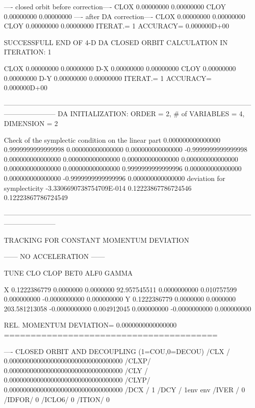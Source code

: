 \begin{ctverbatim}
---- closed orbit before correction----
 CLOX    0.00000000       0.00000000    
 CLOY    0.00000000       0.00000000    
---- after DA correction----
 CLOX    0.00000000       0.00000000    
 CLOY    0.00000000       0.00000000    
 ITERAT.=  1 ACCURACY= 0.000000D+00

SUCCESSFULL END OF 4-D DA CLOSED ORBIT CALCULATION IN ITERATION:    1

 CLOX    0.00000000       0.00000000    
  D-X    0.00000000       0.00000000    
 CLOY    0.00000000       0.00000000    
  D-Y    0.00000000       0.00000000    
 ITERAT.=  1 ACCURACY= 0.000000D+00


-----------------------------------------------------------------------------------------------------------------------------------
     DA INITIALIZATION: ORDER =  2, # of VARIABLES =  4, DIMENSION =  2

Check of the symplectic condition on the linear part
0.000000000000000       0.9999999999999998        0.000000000000000        0.000000000000000    
-0.9999999999999998        0.000000000000000        0.000000000000000        0.000000000000000    
0.000000000000000        0.000000000000000        0.000000000000000       0.9999999999999996    
0.000000000000000        0.000000000000000      -0.9999999999999996        0.000000000000000    
deviation for symplecticity   -3.3306690738754709E-014  %
0.12223867786724546       0.12223867786724549     

-----------------------------------------------------------------------------------------------------------------------------------

    TRACKING FOR CONSTANT MOMENTUM DEVIATION

          ------ NO ACCELERATION ------

                TUNE         CLO            CLOP              BET0           ALF0           GAMMA      

      X    0.1222386779   0.0000000       0.0000000        92.957545511    0.0000000000    0.010757599
                                                            0.000000000   -0.0000000000    0.000000000
      Y    0.1222386779   0.0000000       0.0000000       203.581213058   -0.0000000000    0.004912045
                                                            0.000000000   -0.0000000000    0.000000000


    REL. MOMENTUM DEVIATION= 0.0000000000000000
  ========================================

---- CLOSED ORBIT AND DECOUPLING (1=COU,0=DECOU)
/CLX /            0.000000000000000000000000000000000
/CLXP/            0.000000000000000000000000000000000
/CLY /            0.000000000000000000000000000000000
/CLYP/            0.000000000000000000000000000000000
/DCX /    1
/DCY /    1env
env
/IVER /   0
/IDFOR/   0
/ICLO6/   0
/ITION/   0
\end{ctverbatim}

